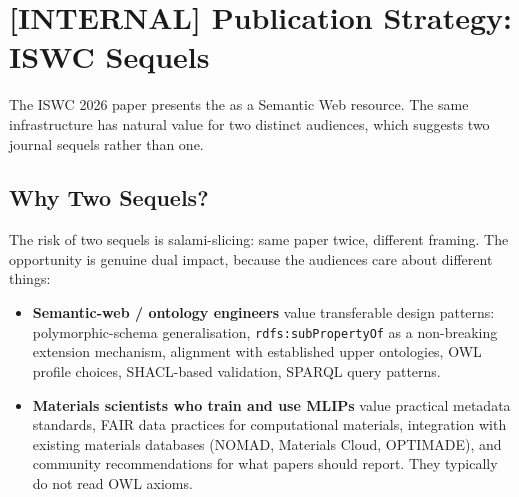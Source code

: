 \section{[INTERNAL] Publication Strategy: ISWC Sequels}
\label{sec:appendix-internal-publication-strategy}

\begin{center}
\end{center}

\bigskip

The ISWC 2026 paper presents the \MLIPsOntology{} as a Semantic Web
resource. The same infrastructure has natural value for two distinct
audiences, which suggests two journal sequels rather than one.

\subsection{Why Two Sequels?}

The risk of two sequels is salami-slicing: same paper twice, different
framing. The opportunity is genuine dual impact, because the audiences
care about different things:

\begin{itemize}
\item \textbf{Semantic-web / ontology engineers} value transferable
  design patterns: polymorphic-schema generalisation,
  \texttt{rdfs:subPropertyOf} as a non-breaking extension mechanism,
  alignment with established upper ontologies, OWL profile choices,
  SHACL-based validation, SPARQL query patterns.
\item \textbf{Materials scientists who train and use MLIPs} value
  practical metadata standards, FAIR data practices for computational
  materials, integration with existing materials databases (NOMAD,
  Materials Cloud, OPTIMADE), and community recommendations for what
  papers should report. They typically do not read OWL axioms.
\end{itemize}

